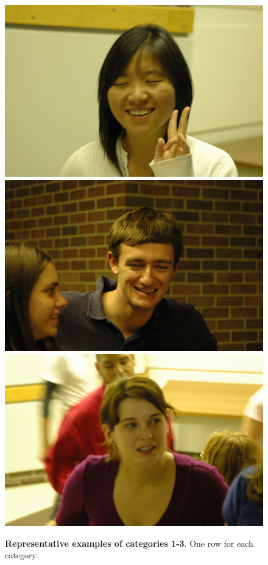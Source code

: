 \begin{figure}
 \caption{{\bf Representative examples of categories 1-3}. One row for each category.\vspace{0mm}}\label{fig:examples1-3}
\centering
\includegraphics[scale=0.35,clip=true]{figures_cvpr/examples/4/success/DSC_1579.JPG} 
\includegraphics[scale=0.35,clip=true]{figures_cvpr/examples/4/success/DSC_1839.JPG} 
\includegraphics[scale=0.35,clip=true]{figures_cvpr/examples/4/success/DSC_1883.JPG} 

\end{figure}
